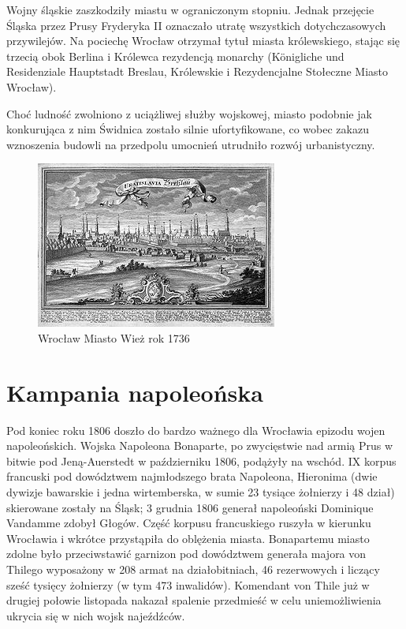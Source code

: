 \documentclass{article}
\begin{document}
Wojny śląskie zaszkodziły miastu w ograniczonym stopniu. Jednak przejęcie Śląska przez Prusy Fryderyka II oznaczało utratę wszystkich dotychczasowych przywilejów. Na pociechę Wrocław otrzymał tytuł miasta królewskiego, stając się trzecią obok Berlina i Królewca rezydencją monarchy (Königliche und Residenziale Hauptstadt Breslau, Królewskie i Rezydencjalne Stołeczne Miasto Wrocław).

Choć ludność zwolniono z uciążliwej służby wojskowej, miasto podobnie jak konkurująca z nim Świdnica zostało silnie ufortyfikowane, co wobec zakazu wznoszenia budowli na przedpolu umocnień utrudniło rozwój urbanistyczny.

\begin{figure}[htbp!]
\centering
\includegraphics[scale=1.5]{4.jpg}
\caption{Wrocław Miasto Wież rok 1736}
\label{fig:4}
\end{figure}



\section{Kampania napoleońska}

Pod koniec roku 1806 doszło do bardzo ważnego dla Wrocławia epizodu wojen napoleońskich. Wojska Napoleona Bonaparte, po zwycięstwie nad armią Prus w bitwie pod Jeną-Auerstedt w październiku 1806, podążyły na wschód. IX korpus francuski pod dowództwem najmłodszego brata Napoleona, Hieronima (dwie dywizje bawarskie i jedna wirtemberska, w sumie 23 tysiące żołnierzy i 48 dział) skierowane zostały na Śląsk; 3 grudnia 1806 generał napoleoński Dominique Vandamme zdobył Głogów. Część korpusu francuskiego ruszyła w kierunku Wrocławia i wkrótce przystąpiła do oblężenia miasta. Bonapartemu miasto zdolne było przeciwstawić garnizon pod dowództwem generała majora von Thilego wyposażony w 208 armat na działobitniach, 46 rezerwowych i liczący sześć tysięcy żołnierzy (w tym 473 inwalidów). Komendant von Thile już w drugiej połowie listopada nakazał spalenie przedmieść w celu uniemożliwienia ukrycia się w nich wojsk najeźdźców.
\end{document}
